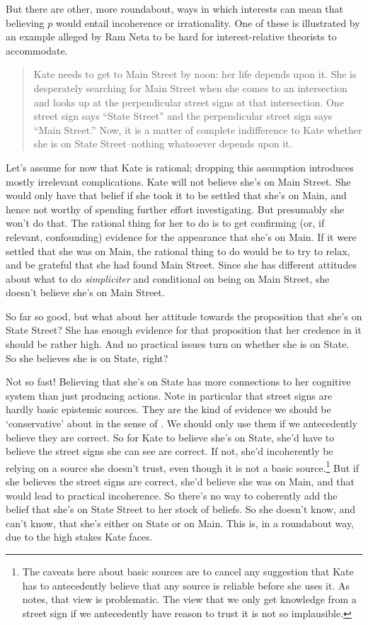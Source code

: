 \documentclass[oneside]{book}
\begin{document}
But there are other, more roundabout, ways in which interests can mean that believing $p$ would entail incoherence or irrationality. One of these is illustrated by an example alleged by Ram Neta to be hard for interest-relative theorists to accommodate.

\begin{quote}
Kate needs to get to Main Street by noon: her life depends upon it. She is desperately searching for Main Street when she comes to an intersection and looks up at the perpendicular street signs at that intersection. One street sign says ``State Street'' and the perpendicular street sign says ``Main Street.'' Now, it is a matter of complete indifference to Kate whether she is on State Street--nothing whatsoever depends upon it. \citep[182]{Neta2007}
\end{quote}

\noindent Let's assume for now that Kate is rational; dropping this assumption introduces mostly irrelevant complications. Kate will not believe she's on Main Street. She would only have that belief if she took it to be settled that she's on Main, and hence not worthy of spending further effort investigating. But presumably she won't do that. The rational thing for her to do is to get confirming (or, if relevant, confounding) evidence for the appearance that she's on Main. If it were settled that she was on Main, the rational thing to do would be to try to relax, and be grateful that she had found Main Street. Since she has different attitudes about what to do \textit{simpliciter} and conditional on being on Main Street, she doesn't believe she's on Main Street.

So far so good, but what about her attitude towards the proposition that she's on State Street? She has enough evidence for that proposition that her credence in it should be rather high. And no practical issues turn on whether she is on State. So she believes she is on State, right?

Not so fast! Believing that she's on State has more connections to her cognitive system than just producing actions. Note in particular that street signs are hardly basic epistemic sources. They are the kind of evidence we should be `conservative' about in the sense of \cite{Pryor2004-PRYWWW}. We should only use them if we antecedently believe they are correct. So for Kate to believe she's on State, she'd have to believe the street signs she can see are correct. If not, she'd incoherently be relying on a source she doesn't trust, even though it is not a basic source.\footnote{The caveats here about basic sources are to cancel any suggestion that Kate has to antecedently believe that any source is reliable before she uses it. As \cite{Pryor2000-PRYTSA} notes, that view is problematic. The view that we only get knowledge from a street sign if we antecedently have reason to trust it is not so implausible.} But if she believes the street signs are correct, she'd believe she was on Main, and that would lead to practical incoherence. So there's no way to coherently add the belief that she's on State Street to her stock of beliefs. So she doesn't know, and can't know, that she's either on State or on Main. This is, in a roundabout way, due to the high stakes Kate faces.
\end{document}
